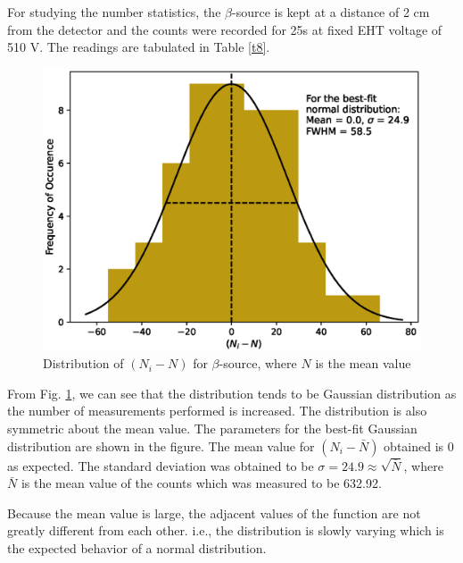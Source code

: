 For studying the number statistics, the $\beta$-source is kept at a distance of 2 cm from the detector and the counts were recorded for 25s at fixed EHT voltage of 510 V. The readings are tabulated in Table \ref{t8}.

\begin{figure}[H]
    \centering
    \includegraphics[width=1\columnwidth]{images/gauss.eps}
    \caption{Distribution of $(N_i-N)$ for $\beta$-source, where $N$ is the mean value}
    \label{g8}
\end{figure}

From Fig. \ref{g8}, we can see that the distribution tends to be Gaussian distribution as the number of measurements performed is increased. The distribution is also symmetric about the mean value. The parameters for the best-fit Gaussian distribution are shown in the figure. The mean value for $(N_i-\bar{N})$ obtained is 0 as expected. The standard deviation was obtained to be $\sigma = 24.9 \approx \sqrt{\bar{N}}$, where $\bar{N}$ is the mean value of the counts which was measured to be 632.92.

Because the mean value is large, the adjacent values of the function are not greatly different from each other. i.e., the distribution is slowly varying which is the expected behavior of a normal distribution.
